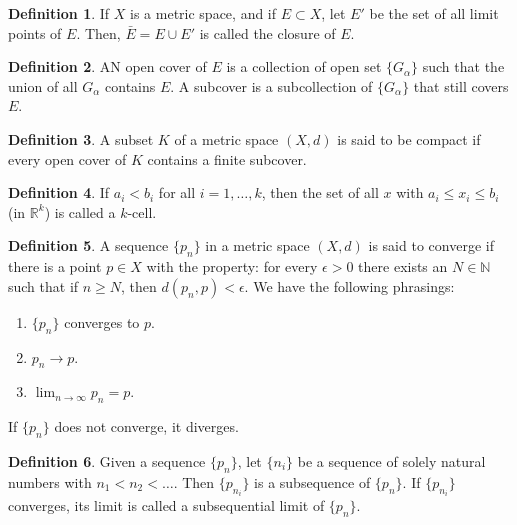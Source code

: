 \documentclass[12pt]{article}
\theoremstyle{definition}
\newtheorem{definition}{Definition}
\theoremstyle{named}
\begin{document}
\renewcommand{\thedefinition}{6.1}
\begin{definition}
    If $X$ is a metric space, and if $E \subset X$, let $E'$ be the set of all limit points of $E$. Then, $\bar{E} = E \cup E'$ is called the closure of $E$. 
\end{definition}

\renewcommand{\thedefinition}{6.1}
\begin{definition}
    AN open cover of $E$ is a collection of open set $\{G_\alpha\}$ such that the union of all $G_\alpha$ contains $E$. A subcover is a subcollection of $\{G_\alpha\}$ that still covers $E$. 
\end{definition}

\renewcommand{\thedefinition}{6.1}
\begin{definition}
    A subset $K$ of a metric space $(X,d)$ is said to be compact if every open cover of $K$ contains a finite subcover. 
\end{definition}

\renewcommand{\thedefinition}{6.1}
\begin{definition}
    If $a_i < b_i$ for all $i=1,\dots,k$, then the set of all $x$ with $a_i \leq x_i \leq b_i$ (in $\mathbb{R}^k$) is called a $k$-cell. 
\end{definition}

\renewcommand{\thedefinition}{6.1}
\begin{definition}
    A sequence $\{p_n\}$ in a metric space $(X,d)$ is said to converge if there is a point $p \in X$ with the property: for every $\epsilon > 0$ there exists an $N \in \mathbb{N}$ such that if $n \geq N$, then $d(p_n,p) < \epsilon$. We have the following phrasings: 
    \begin{enumerate}
        \item $\{p_n\}$ converges to $p$. 
        \item $p_n \to p$. 
        \item $\lim_{n \to \infty} p_n = p$. 
    \end{enumerate}
    If $\{p_n\}$ does not converge, it diverges. 
\end{definition}

\renewcommand{\thedefinition}{6.1}
\begin{definition}
    Given a sequence $\{p_n\}$, let $\{n_i\}$ be a sequence of solely natural numbers with $n_1 < n_2 < \dots$. Then $\{p_{n_i}\}$ is a subsequence of $\{p_n\}$. If $\{p_{n_i}\}$ converges, its limit is called a subsequential limit of $\{p_n\}$. 
\end{definition}
\end{document}
